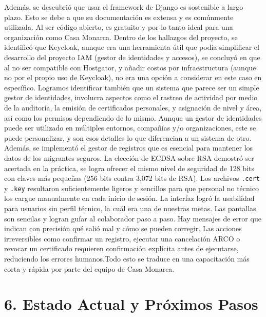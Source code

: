 \documentclass[10pt,letterpaper]{report}
\begin{document}
Además, se descubrió que usar el framework de Django es sostenible a largo plazo. Esto se debe a que su documentación es extensa y es comúnmente utilizada. Al ser código abierto, es gratuito y por lo tanto ideal para una organización como Casa Monarca. 
Dentro de los hallazgos del proyecto, se identificó que Keycloak, aunque era una herramienta útil que podía simplificar el desarrollo del proyecto IAM (gestor de identidades y accesos), se concluyó en que al no ser compatible con Hostgator, y añadir costos por infraestructura (aunque no por el propio uso de Keycloak), no era una opción a considerar en este caso en específico. 
Logramos identificar también que un sistema que parece ser un simple gestor de identidades, involucra aspectos como el rastreo de actividad por medio de la auditoría, la emisión de certificados personales, y asignación de nivel y área, así como los permisos dependiendo de lo mismo. Aunque un gestor de identidades puede ser utilizado en múltiples entornos, compañías y/o organizaciones, este se puede personalizar, y son esos detalles lo que diferencian a un sistema de otro. Además, se implementó el gestor de registros que es esencial para mantener los datos de los migrantes seguros.
La elección de ECDSA sobre RSA demostró ser acertada en la práctica, se logra ofrecer el mismo nivel de seguridad de 128 bits con claves más pequeñas (256 bits contra 3,072 bits de RSA). Los archivos \texttt{.cert} y \texttt{.key} resultaron suficientemente ligeros y sencillos para que personal no técnico los cargue manualmente en cada inicio de sesión. 
La interfaz logró la usabilidad para usuarios sin perfil técnico, la cuál era una de nuestras metas. Las pantallas son sencilas y logran guíar al colaborador paso a paso. Hay mensajes de error que indican con precisión qué salió mal y cómo se pueden corregir. Las acciones irreversibles como confirmar un registro, ejecutar una cancelación ARCO o revocar un certificado requieren confirmación explícita antes de ejecutarse, reduciendo los errores humanos.Todo esto se traduce en una capacitación más corta y rápida por parte del equipo de Casa Monarca.

 
\section*{6. Estado Actual y Próximos Pasos}
 
\end{document}
